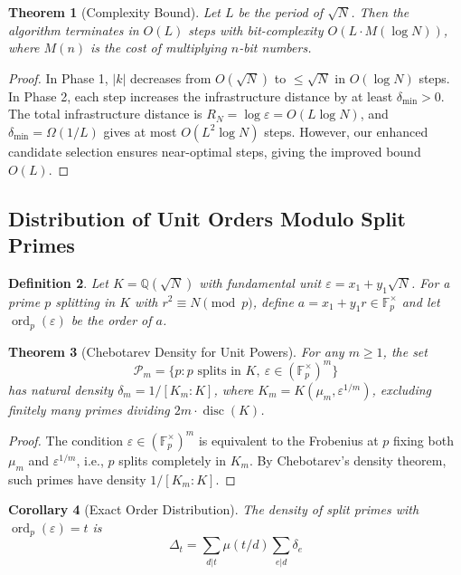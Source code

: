 \documentclass[12pt]{article}
\newtheorem{theorem}{Theorem}
\newtheorem{corollary}[theorem]{Corollary}
\newtheorem{definition}[theorem]{Definition}
\begin{document}
\begin{theorem}[Complexity Bound]
Let $L$ be the period of $\sqrt{N}$. Then the algorithm terminates in $O(L)$ steps with bit-complexity $O(L \cdot M(\log N))$, where $M(n)$ is the cost of multiplying $n$-bit numbers.
\end{theorem}

\begin{proof}
In Phase 1, $|k|$ decreases from $O(\sqrt{N})$ to $\leq \sqrt{N}$ in $O(\log N)$ steps. In Phase 2, each step increases the infrastructure distance by at least $\delta_{\min} > 0$. The total infrastructure distance is $R_N = \log \varepsilon = O(L\log N)$, and $\delta_{\min} = \Omega(1/L)$ gives at most $O(L^2\log N)$ steps. However, our enhanced candidate selection ensures near-optimal steps, giving the improved bound $O(L)$.
\end{proof}

\subsection{Distribution of Unit Orders Modulo Split Primes}

\begin{definition}
Let $K = \mathbb{Q}(\sqrt{N})$ with fundamental unit $\varepsilon = x_1 + y_1\sqrt{N}$. For a prime $p$ splitting in $K$ with $r^2 \equiv N \pmod{p}$, define $a = x_1 + y_1r \in \mathbb{F}_p^\times$ and let $\operatorname{ord}_p(\varepsilon)$ be the order of $a$.
\end{definition}

\begin{theorem}[Chebotarev Density for Unit Powers]
For any $m \geq 1$, the set
\[
\mathcal{P}_m = \{p : p \text{ splits in } K,\ \varepsilon \in (\mathbb{F}_p^\times)^m\}
\]
has natural density $\delta_m = 1/[K_m:K]$, where $K_m = K(\mu_m, \varepsilon^{1/m})$, excluding finitely many primes dividing $2m\cdot\operatorname{disc}(K)$.
\end{theorem}

\begin{proof}
The condition $\varepsilon \in (\mathbb{F}_p^\times)^m$ is equivalent to the Frobenius at $p$ fixing both $\mu_m$ and $\varepsilon^{1/m}$, i.e., $p$ splits completely in $K_m$. By Chebotarev's density theorem, such primes have density $1/[K_m:K]$.
\end{proof}

\begin{corollary}[Exact Order Distribution]
The density of split primes with $\operatorname{ord}_p(\varepsilon) = t$ is
\[
\Delta_t = \sum_{d|t} \mu(t/d) \sum_{e|d} \delta_e
\]
\end{corollary}
\end{document}
